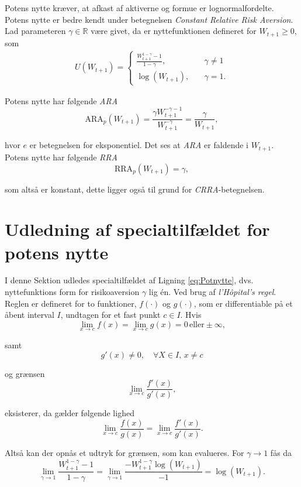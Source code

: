 \documentclass[
  a4paper,
  oneside]{memoir}
\begin{document}
Potens nytte kræver, at afkast af aktiverne og formue er lognormalfordelte. Potens nytte er bedre kendt under betegnelsen \emph{Constant Relative Risk Aversion}. Lad parameteren \(\gamma\in\mathbb{R}\) være givet, da er nyttefunktionen defineret for \(W_{t+1}\geq 0\), som
\begin{align*}
U(W_{t+1})=\begin{cases} \frac{W_{t+1}^{1-\gamma}-1}{1-\gamma},\quad &\gamma\neq 1\\
\log(W_{t+1}),\quad &\gamma = 1. \end{cases}
\end{align*}

Potens nytte har følgende \emph{ARA}
\[\text{ARA}_p(W_{t+1})= \frac{\gamma W_{t+1}^{-\gamma-1}}{W_{t+1}^{-\gamma}}=\frac{\gamma}{W_{t+1}},\]

hvor \(e\) er betegnelsen for eksponentiel. Det ses at \emph{ARA} er faldende i \(W_{t+1}\). Potens nytte har følgende \emph{RRA}
\[\text{RRA}_p(W_{t+1})= \gamma,\]

som altså er konstant, dette ligger også til grund for \emph{CRRA}-betegnelsen.

\hypertarget{udledning-af-specialtilfuxe6ldet-for-potens-nytte}{%
\section{Udledning af specialtilfældet for potens nytte}\label{udledning-af-specialtilfuxe6ldet-for-potens-nytte}}

I denne Sektion udledes specialtilfældet af Ligning \eqref{eq:Potnytte}, dvs. nyttefunktions form for risikoaversion \(\gamma\) lig én. Ved brug af \emph{l'Hôpital's regel}. Reglen er defineret for to funktioner, \(f(\cdot)\) og \(g(\cdot)\), som er differentiable på et åbent interval \(I\), undtagen for et fast punkt \(c\in I\). Hvis
\[\lim_{x\to c} f(x)=\lim_{x\to c}g(x)=0\,\text{eller} \pm \infty,\]

samt
\[g'(x)\neq 0,\quad \forall X\in I,\,x\neq c\]

og grænsen
\[\lim_{x\to c} \frac{f'(x)}{g'(x)},\]

eksisterer, da gælder følgende lighed
\[\lim_{x\to c}\frac{f(x)}{g(x)}=\lim_{x\to c}\frac{f'(x)}{g'(x)}.\]

Altså kan der opnås et udtryk for grænsen, som kan evalueres. For \(\gamma\rightarrow 1\) fås da
\[\lim_{\gamma\to 1}\frac{W_{t+1}^{1-\gamma}-1}{1-\gamma}=\lim_{\gamma\to 1}\frac{-W_{t+1}^{1-\gamma}\log\left(W_{t+1}\right)}{-1}=\log\left(W_{t+1}\right).\]
\end{document}
